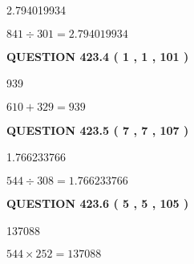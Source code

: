 \documentclass{ctexart}
\begin{document}
  
 
 
\noindent{}

2.794019934
 
 
 
 
\noindent{}

$ %
841 \div  %
301=   %
2.794019934$
 
 
  
\vspace{0.2in}
  
{\textbf{\Large{QUESTION
423.4 
 ( 1 , 1 , 101 )
}}}
  
  
 
 
\noindent{}

939
 
 
 
 
\noindent{}

$ %
610 +  %
329=   %
939$
 
 
  
\vspace{0.2in}
  
{\textbf{\Large{QUESTION
423.5 
 ( 7 , 7 , 107 )
}}}
  
  
 
 
\noindent{}

1.766233766
 
 
 
 
\noindent{}

$ %
544 \div  %
308=   %
1.766233766$
 
 
  
\vspace{0.2in}
  
{\textbf{\Large{QUESTION
423.6 
 ( 5 , 5 , 105 )
}}}
  
  
 
 
\noindent{}

137088
 
 
 
 
\noindent{}

$ %
544 \times  %
252=   %
137088$
 
\end{document}
